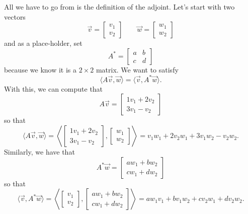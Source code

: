 \documentclass{ximera}
\begin{document}
\begin{exampleSol}
    All we have to go from is the definition of the adjoint. Let's start with two vectors 
    \[ 
        \vec{v} = 
        \begin{bmatrix} 
            v_1 \\ 
            v_2 
        \end{bmatrix} 
        \qquad \vec{w} = 
        \begin{bmatrix} 
            w_1 \\ 
            w_2 
        \end{bmatrix} 
    \] 
    and as a place-holder, set
    \[ 
        A^* = 
        \begin{bmatrix} 
            a & b \\ 
            c & d 
        \end{bmatrix} 
    \] 
    because we know it is a $2\times 2$ matrix. We want to satisfy
    \[  
        \langle A\vec{v} , \vec{w} \rangle = \langle \vec{v}, A^*\vec{w} \rangle. 
    \] 
    With this, we can compute that
    \[ 
        A\vec{v} = 
        \begin{bmatrix} 
            1v_1 + 2v_2 \\ 
            3v_1 - v_2 
        \end{bmatrix} 
    \] 
    so that 
    \begin{equation}
        \langle A\vec{v} , \vec{w} \rangle = \left\langle 
        \begin{bmatrix} 
            1v_1 + 2v_2 \\ 
            3v_1 - v_2 
        \end{bmatrix}, 
        \begin{bmatrix} 
            w_1 \\ 
            w_2 
        \end{bmatrix} 
        \right\rangle = v_1w_1 + 2v_2w_1 + 3v_1w_2 - v_2w_2 .
        \label{eq:adjoint1}
    \end{equation} Similarly, we have that
    \[ 
        A^*\vec{w} = 
        \begin{bmatrix} 
            aw_1 + bw_2 \\ 
            cw_1 + dw_2 
        \end{bmatrix} 
    \] 
    so that
    \begin{equation}
        \langle \vec{v}, A^*\vec{w} \rangle = \left\langle 
        \begin{bmatrix} 
            v_1 \\ 
            v_2 
        \end{bmatrix}, 
        \begin{bmatrix} 
            aw_1 + bw_2 \\ 
            cw_1 + dw_2 
        \end{bmatrix} 
        \right\rangle = aw_1v_1 + bv_1w_2 + cv_2w_1 + dv_2w_2.
        \label{eq:adjoint2}
    \end{equation}
    

\end{exampleSol}
\end{document}
